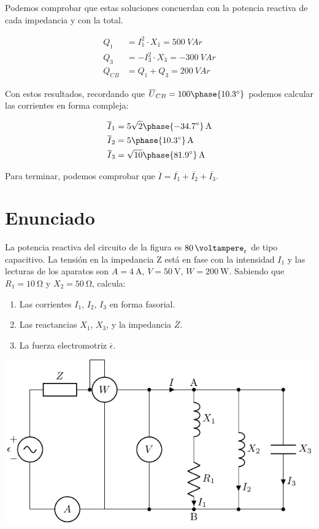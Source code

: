 Podemos comprobar que estas soluciones concuerdan con la potencia
reactiva de cada impedancia y con la total.

\begin{align*}
  Q_1 &= I_1^2 \cdot X_1 = \qty{500}{VA}r\\
  Q_3 &= - I_3^2 \cdot X_3 = \qty{-300}{VA}r\\
  Q_{CB} &= Q_1 + Q_3 =\qty{200}{VA}r
\end{align*}

Con estos resultados, recordando que  $\overline{U}_{CB} =
100\phase{\ang{10.3}}$ podemos calcular las corrientes en forma
compleja:

\begin{align*}
  \overline{I}_1 &=  \qty[parse-numbers=false]{5\sqrt{2}\phase{\ang{-34.7}}}{\ampere}\\
  \overline{I}_2 &=  \qty[parse-numbers=false]{5\phase{\ang{10.3}}}{\ampere}\\
  \overline{I}_3 &=
  \qty[parse-numbers=false]{\sqrt{10}\phase{\ang{81.9}}}{\ampere}
\end{align*}

Para terminar, podemos comprobar que $\overline{I} = \overline{I_1}
+ \overline{I_2} + \overline{I_3}$.


\section{Enunciado}

La potencia reactiva del circuito de la figura es $\qty{80}{\voltampere_r}$ de tipo capacitivo. La tensión en la impedancia Z está en fase con la intensidad $I_1$ y las lecturas de los aparatos son $A = \qty{4}{\ampere}$, $V = \qty{50}{\volt}$, $W = \qty{200}{\watt}$. Sabiendo que $R_1 = \qty{10}{\ohm}$ y $X_2 = \qty{50}{\ohm}$, calcula:

\begin{enumerate}
\item Las corrientes $I_1$, $I_2$, $I_3$ en forma fasorial.
\item Las reactancias $X_1$, $X_3$, y la impedancia $\overline{Z}$.
\item La fuerza electromotriz $\overline{\epsilon}$.
\end{enumerate}
\begin{center}
  \includegraphics{figuras/BT2_circuitoCapacitivo}
\end{center}

